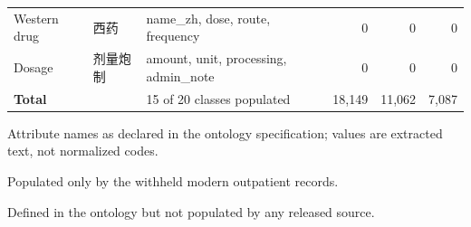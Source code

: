 \begin{table}[p]
\begin{threeparttable}
\begin{tabularx}{\linewidth}{llXrrr}
Western drug \textdagger{} & 西药 & name\_zh, dose, route, frequency & 0 & 0 & 0 \\
Dosage \textdaggerdbl{} & 剂量炮制 & amount, unit, processing, admin\_note & 0 & 0 & 0 \\
\textbf{Total} &  & 15 of 20 classes populated & 18,149 & 11,062 & 7,087 \\
\bottomrule
\end{tabularx}
\begin{tablenotes}\footnotesize
\item * Attribute names as declared in the ontology specification; values are extracted text, not normalized codes.
\item \textdagger{} Populated only by the withheld modern outpatient records.
\item \textdaggerdbl{} Defined in the ontology but not populated by any released source.
\end{tablenotes}
\end{threeparttable}
\end{table}

